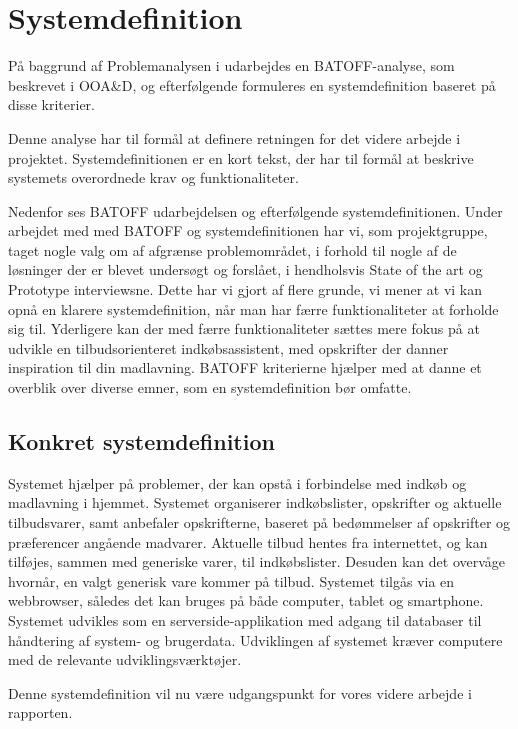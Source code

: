 \section{Systemdefinition}\label{sysdeffi}
På baggrund af Problemanalysen i  udarbejdes en BATOFF-analyse, som beskrevet i OOA\&D\citep{OOA&D2001}, og efterfølgende formuleres en systemdefinition baseret på disse kriterier.

Denne analyse har til formål at definere retningen for det videre arbejde i projektet.
Systemdefinitionen er en kort tekst, der har til formål at beskrive systemets overordnede krav og funktionaliteter.

Nedenfor ses BATOFF udarbejdelsen og efterfølgende systemdefinitionen.
Under arbejdet med med BATOFF og systemdefinitionen har vi, som  projektgruppe, taget nogle valg om af afgrænse problemområdet, i forhold til nogle af de løsninger der er blevet undersøgt og forslået, i hendholsvis State of the art og Prototype interviewsne.
Dette har vi gjort af flere grunde, vi mener at vi kan opnå en klarere systemdefinition, når man har færre funktionaliteter at forholde sig til.
Yderligere kan der med færre funktionaliteter sættes mere fokus på at udvikle en tilbudsorienteret indkøbsassistent, med opskrifter der danner inspiration til din madlavning.
BATOFF kriterierne hjælper med at danne et overblik over diverse emner, som en systemdefinition bør omfatte.




\subsection{Konkret systemdefinition}\label{Sysdef}

Systemet hjælper på problemer, der kan opstå i forbindelse med indkøb og madlavning i hjemmet.
Systemet organiserer indkøbslister, opskrifter og aktuelle tilbudsvarer, samt anbefaler opskrifterne, baseret på bedømmelser af opskrifter og præferencer angående madvarer.
Aktuelle tilbud hentes fra internettet, og kan tilføjes, sammen med generiske varer, til indkøbslister.
Desuden kan det overvåge hvornår, en valgt generisk vare kommer på tilbud.
Systemet tilgås via en webbrowser, således det kan bruges på både computer, tablet og smartphone.
Systemet udvikles som en serverside-applikation med adgang til databaser til håndtering af system- og brugerdata.
Udviklingen af systemet kræver computere med de relevante udviklingsværktøjer.

Denne systemdefinition vil nu være udgangspunkt for vores videre arbejde i rapporten.
